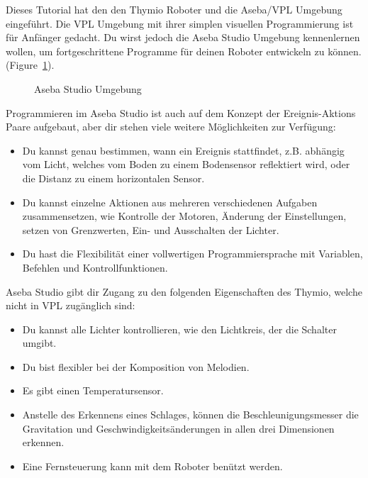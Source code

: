 \label{ch.next}


Dieses Tutorial hat den den Thymio Roboter und die Aseba/VPL Umgebung eingeführt. Die VPL Umgebung mit ihrer simplen visuellen Programmierung ist für Anfänger gedacht. Du wirst jedoch die Aseba Studio Umgebung kennenlernen wollen, um fortgeschrittene Programme für deinen Roboter entwickeln zu können. (Figure~\ref{fig.studio}).

\begin{figure}[hbt]
\begin{center}
\caption{Aseba Studio Umgebung}
\label{fig.studio}
\end{center}
\end{figure}

Programmieren im Aseba Studio ist auch auf dem Konzept der Ereignis-Aktions Paare aufgebaut, aber dir stehen viele weitere Möglichkeiten zur Verfügung:

\begin{itemize}
\item Du kannst genau bestimmen, wann ein Ereignis stattfindet, z.B. abhängig vom Licht, welches vom Boden zu einem Bodensensor reflektiert wird, oder die Distanz zu einem horizontalen Sensor.
\item  Du kannst einzelne Aktionen aus mehreren verschiedenen Aufgaben zusammensetzen, wie Kontrolle der Motoren, Änderung der Einstellungen, setzen von Grenzwerten, Ein- und Ausschalten der Lichter.
\item  Du hast die Flexibilität einer vollwertigen Programmiersprache mit Variablen, Befehlen und Kontrollfunktionen.

\end{itemize}

Aseba Studio gibt dir Zugang zu den folgenden Eigenschaften des Thymio, welche nicht in VPL zugänglich sind:

\begin{itemize}
\item Du kannst alle Lichter kontrollieren, wie den Lichtkreis, der die Schalter umgibt.
\item Du bist flexibler bei der Komposition von Melodien.
\item Es gibt einen Temperatursensor.
\item Anstelle des Erkennens eines Schlages, können die Beschleunigungsmesser die Gravitation und Geschwindigkeitsänderungen in allen drei Dimensionen erkennen. 
\item Eine Fernsteuerung kann mit dem Roboter benützt werden.
\end{itemize}

